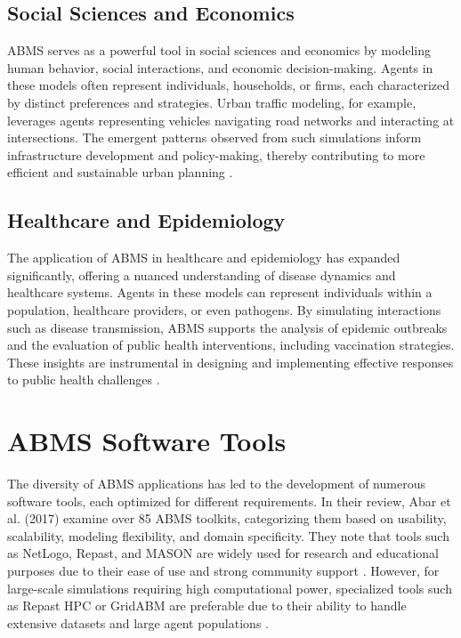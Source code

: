 \subsection{Social Sciences and Economics} ABMS serves as a powerful tool in social sciences and economics by modeling human behavior, social interactions, and economic decision-making. Agents in these models often represent individuals, households, or firms, each characterized by distinct preferences and strategies. Urban traffic modeling, for example, leverages agents representing vehicles navigating road networks and interacting at intersections. The emergent patterns observed from such simulations inform infrastructure development and policy-making, thereby contributing to more efficient and sustainable urban planning \cite{abar2017}.

\subsection{Healthcare and Epidemiology} The application of ABMS in healthcare and epidemiology has expanded significantly, offering a nuanced understanding of disease dynamics and healthcare systems. Agents in these models can represent individuals within a population, healthcare providers, or even pathogens. By simulating interactions such as disease transmission, ABMS supports the analysis of epidemic outbreaks and the evaluation of public health interventions, including vaccination strategies. These insights are instrumental in designing and implementing effective responses to public health challenges \cite{abar2017}.

\newpage
\section{ABMS Software Tools}

The diversity of ABMS applications has led to the development of numerous software tools, each optimized for different requirements. In their review, Abar et al. (2017) examine over 85 ABMS toolkits, categorizing them based on usability, scalability, modeling flexibility, and domain specificity. They note that tools such as NetLogo, Repast, and MASON are widely used for research and educational purposes due to their ease of use and strong community support \cite{abar2017}. However, for large-scale simulations requiring high computational power, specialized tools such as Repast HPC or GridABM are preferable due to their ability to handle extensive datasets and large agent populations \cite{abar2017}.


